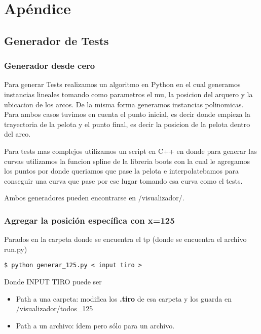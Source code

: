 \section{Apéndice}
\subsection{Generador de Tests}
\subsubsection{Generador desde cero}
Para generar Tests realizamos un algoritmo en Python en el cual generamos instancias lineales tomando como parametros el mu, la posicion del arquero y la ubicacion de los arcos. De la misma forma generamos instancias polinomicas. Para ambos casos tuvimos en cuenta el punto inicial, es decir donde empieza la trayectoria de la pelota y el punto final, es decir la posicion de la pelota dentro del arco.

Para tests mas complejos utilizamos un script en C++ en donde para generar las curvas utilizamos la funcion spline de la libreria boots con la cual le agregamos los puntos por donde queriamos que pase la pelota e interpolatebamos para conseguir una curva que pase por ese lugar tomando esa curva como el tests.

Ambos generadores pueden encontrarse en /visualizador/.

\subsubsection{Agregar la posición específica con x=125}
\begin{framed}
Parados en la carpeta donde se encuentra el tp (donde se encuentra el archivo run.py)
\begin{verbatim}
$ python generar_125.py < input tiro > 
\end{verbatim}

Donde INPUT TIRO puede ser 
\begin{itemize}
	\item Path a una carpeta: modifica los \textbf{.tiro} de esa carpeta y los guarda en
    /visualizador/todos\_125
	\item Path a un archivo: ídem pero sólo para un archivo.
\end{itemize}

\end{framed}

